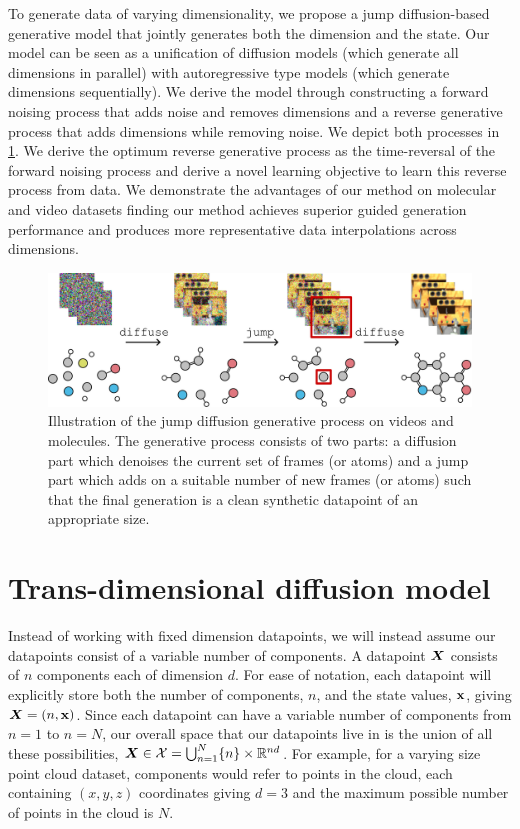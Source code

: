 To generate data of varying dimensionality, we propose a jump diffusion-based generative model that jointly generates both the dimension and the state. Our model can be seen as a unification of diffusion models (which generate all dimensions in parallel) with autoregressive type models (which generate dimensions sequentially). We derive the model through constructing a forward noising process that adds noise and removes dimensions and a reverse generative process that adds dimensions while removing noise. We depict both processes in \cref{fig:tddm-fig1}. We derive the optimum reverse generative process as the time-reversal of the forward noising process and derive a novel learning objective to learn this reverse process from data. We demonstrate the advantages of our method on molecular and video datasets finding our method achieves superior guided generation performance and produces more representative data interpolations across dimensions.

\begin{figure}
    \centering
    \includegraphics[width=\textwidth]{figs/tddm/fig1.pdf}
    \caption{Illustration of the jump diffusion generative process on videos and molecules. The generative process consists of two parts: a diffusion part which denoises the current set of frames (or atoms) and a jump part which adds on a suitable number of new frames (or atoms) such that the final generation is a clean synthetic datapoint of an appropriate size.
    }
    \label{fig:tddm-fig1}
\end{figure}


\section{Trans-dimensional diffusion model}
Instead of working with fixed dimension datapoints, we will instead assume our datapoints consist of a variable number of components. A datapoint ${\bm{X}}$ consists of $n$ components each of dimension $d$. For ease of notation, each datapoint will explicitly store both the number of components, $n$, and the state values, ${\mathbf{x}}$, giving ${\bm{X}} = (n, {\mathbf{x}})$. Since each datapoint can have a variable number of components from $n=1$ to $n=N$, our overall space that our datapoints live in is the union of all these possibilities, ${\bm{X}} \in {\mathcal{X}} = \bigcup_{n=1}^N \{n \} \times \mathbb{R}^{nd}$. For example, for a varying size point cloud dataset, components would refer to points in the cloud, each containing $(x,y,z)$ coordinates giving $d=3$ and the maximum possible number of points in the cloud is $N$.

